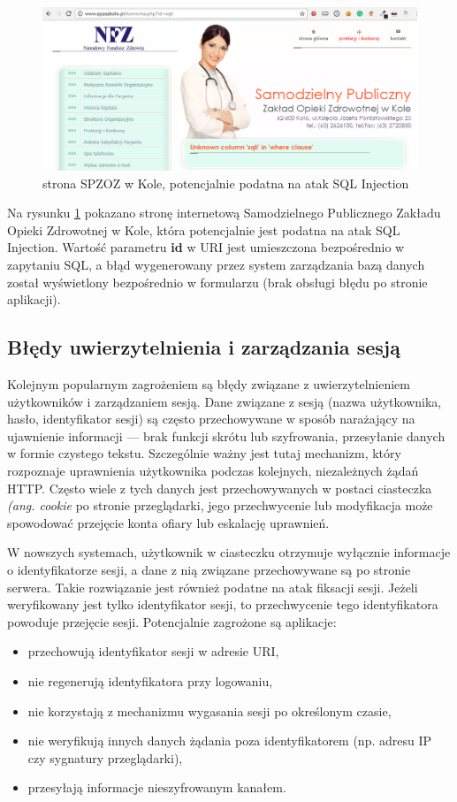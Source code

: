 \documentclass[11pt,a4paper,polish,thesis]{dcsbook}
\begin{document}
\begin{figure}[h]
\centering
\includegraphics[scale=0.4]{szpital}

\caption{strona SPZOZ w Kole, potencjalnie podatna na atak SQL Injection}
\label{fig:szpital}
\end{figure}

Na rysunku \ref{fig:szpital} pokazano stronę internetową Samodzielnego Publicznego Zakładu Opieki Zdrowotnej w Kole, która potencjalnie jest podatna na atak SQL Injection. Wartość parametru \textbf{id} w URI jest umieszczona bezpośrednio w zapytaniu SQL, a błąd wygenerowany przez system zarządzania bazą danych został wyświetlony bezpośrednio w formularzu (brak obsługi błędu po stronie aplikacji).

\subsection{Błędy uwierzytelnienia i zarządzania sesją}
Kolejnym popularnym zagrożeniem są błędy związane z uwierzytelnieniem użytkowników i zarządzaniem sesją. Dane związane z sesją (nazwa użytkownika, hasło, identyfikator sesji) są często przechowywane w sposób narażający na ujawnienie informacji --- brak funkcji skrótu lub szyfrowania, przesyłanie danych w formie czystego tekstu. Szczególnie ważny jest tutaj mechanizm, który rozpoznaje uprawnienia użytkownika podczas kolejnych, niezależnych żądań HTTP. Często wiele z tych danych jest przechowywanych w postaci ciasteczka \textit{(ang. cookie} po stronie przeglądarki, jego przechwycenie lub modyfikacja może spowodować przejęcie konta ofiary lub eskalację uprawnień.

W nowszych systemach, użytkownik w ciasteczku otrzymuje wyłącznie informacje o identyfikatorze sesji, a dane z nią związane przechowywane są po stronie serwera. Takie rozwiązanie jest również podatne na atak fiksacji sesji. Jeżeli weryfikowany jest tylko identyfikator sesji, to przechwycenie tego identyfikatora powoduje przejęcie sesji. Potencjalnie zagrożone są aplikacje:
\begin{itemize}
\item przechowują identyfikator sesji w adresie URI,
\item nie regenerują identyfikatora przy logowaniu,
\item nie korzystają z mechanizmu wygasania sesji po określonym czasie,
\item nie weryfikują innych danych żądania poza identyfikatorem (np. adresu IP czy sygnatury przeglądarki),
\item przesyłają informacje nieszyfrowanym kanałem.
\end{itemize}
\end{document}
